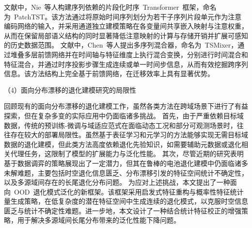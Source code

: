 文献\cite{nie2023a}中，Nie~等人构建序列依赖的片段化时序~Transformer~框架，命名为~PatchTST。该方法通过将原始时间序列划分为若干子序列片段单元作为注意编码网络的输入，并采用通道独立建模策略在各变量间共享嵌入映射与注意权重，从而在保留局部语义结构的同时显著降低注意映射的计算与存储开销并扩展可感知的历史数据范围。
文献\cite{chen2023tsmixer}中，Chen~等人提出多序列混合器，命名为~TSMixer，通过堆叠多层前馈网络并在时间轴与特征维度上执行混合变换，分别进行时间混合和特征混合，并通过时序投影步骤生成连续或单一时间步信息，从而有效挖掘跨序列信息。该方法结构上完全基于前馈网络，在迁移效率上具有显著优势。

（4）面向分布漂移的退化建模研究的局限性

回顾现有的面向分布漂移的退化建模工作，虽然各类方法在跨域场景下进行了有益探索，但在复杂多变的实际应用中仍面临诸多挑战。
首先，由于严重依赖目标域数据，传统的预训练-微调与域适应范式在面临动态工况和部分可观测场景时，往往存在较大的部署局限性。虽然基于表征学习和元学习的方法能够实现无需目标域数据的退化建模，但此类方法高度依赖退化先验知识，如需要辅助元数据或退化相关代理任务，这限制了模型的扩展能力与泛化性能。
其次，尽管近期的研究表明基于数据调弈的策略展现出了一定潜力，但其在鲁棒的电池退化建模中仍面临诸多未解难题，主要包括时空退化信息匮乏、分布漂移引发的特征空间统计不确定性，以及多源域间存在的长尾退化分布问题。
为应对上述挑战，本文提出了一种面向~OOD~退化模式泛化的新框架。该框架采用启发式特征重构与概率性特征统计量生成策略，在低复杂度的潜在特征空间中生成连续的退化模式，以克服时空信息匮乏与统计不确定性难题。进一步地，本文设计了一种结合统计特征校正的增强策略，用于解决多源域间长尾分布带来的泛化性能下降问题。




